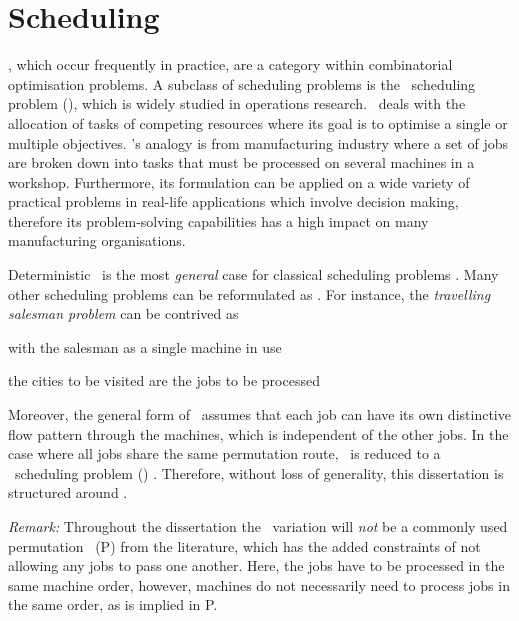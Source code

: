 
\chapter{Scheduling}\label{ch:scheduling}
, which occur frequently in practice, are a category within combinatorial optimisation problems. 
A subclass of scheduling problems is the \jsp\ scheduling problem (\JSP), which 
is widely studied in operations research. 
\Jsp\ deals with the allocation of tasks of competing resources where its goal is to optimise a single or multiple objectives. 
\Jsp's analogy is from manufacturing industry where a set of jobs are broken down into tasks that must be processed on several machines in a workshop. 
Furthermore, its formulation can be applied on a wide variety of practical problems in real-life applications which involve decision making, therefore its problem-solving capabilities has a high impact on many manufacturing organisations. %

Deterministic \JSP\ is the most \emph{general} case for classical scheduling problems \citep{Jain99}. 
Many other scheduling problems can be reformulated as \JSP. 
For instance, the \textit{travelling salesman problem} can be contrived as \jsp
\begin{enumerate*}[label={{}}]
    \item with the salesman as a single machine in use 
    \item the cities to be visited are the jobs to be processed
\end{enumerate*}
Moreover, the general form of \JSP\ assumes that each job can have its own 
distinctive flow pattern through the machines, which is independent of the 
other jobs. 
In the case where all jobs share the same permutation route, \jsp\ is reduced 
to a \fsp\ scheduling problem (\FSP) \citep{Guinet1998,Tay08}. 
Therefore, without loss of generality, this dissertation is structured around 
\JSP. 

\emph{Remark:} Throughout the dissertation the \FSP\ variation will \emph{not} 
be a commonly used permutation \fsp\ (P\FSP) from the literature, which has 
the added constraints of not allowing any jobs to pass one another.
Here, the jobs have to be processed in the same machine order, however, 
machines do not necessarily need to process jobs in the same order, as is 
implied in P\FSP.


